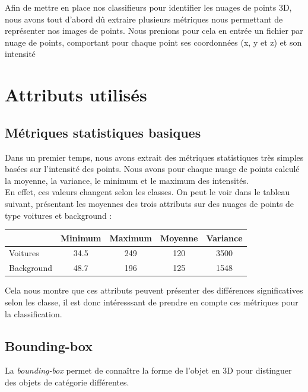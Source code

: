 Afin de mettre en place nos classifieurs pour identifier les nuages de points 3D, nous avons tout d'abord dû extraire plusieurs métriques nous permettant de représenter nos images de points. Nous prenions pour cela en entrée un fichier par nuage de points, comportant pour chaque point ses coordonnées (x, y et z) et son intensité

\section{Attributs utilisés}
	\subsection{Métriques statistiques basiques}
		Dans un premier temps, nous avons extrait des métriques statistiques très simples basées sur l'intensité des points. Nous avons pour chaque nuage de points calculé la moyenne, la variance, le minimum et le maximum des intensités.\\

		En effet, ces valeurs changent selon les classes. On peut le voir dans le tableau suivant, présentant les moyennes des trois attributs sur des nuages de points de type voitures et background :\\

		\begin{center}
			\begin{tabular}{|l||c|c|c|c|}
			  \hline
			  & Minimum & Maximum & Moyenne & Variance \\
			  \hline
			  Voitures & 34.5 & 249 & 120 & 3500 \\
			  Background & 48.7 & 196 & 125 & 1548 \\
			  \hline
			\end{tabular}
		\end{center}


		Cela nous montre que ces attributs peuvent présenter des différences significatives selon les classe, il est donc intéresssant de prendre en compte ces métriques pour la classification.

	\subsection{Bounding-box}
		La \emph{bounding-box} permet de connaître la forme de l'objet en 3D pour distinguer des objets de catégorie différentes.

